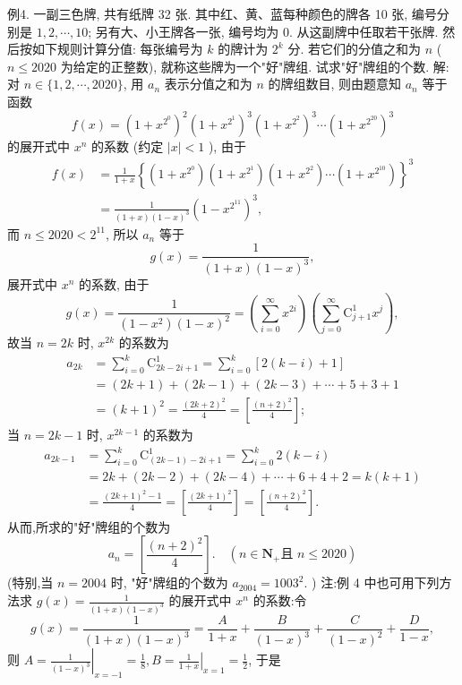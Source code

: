 例4. 一副三色牌, 共有纸牌 32 张.
其中红、黄、蓝每种颜色的牌各 10 张, 编号分别是 $1,2, \cdots, 10$; 另有大、小王牌各一张, 编号均为 0. 从这副牌中任取若干张牌.
然后按如下规则计算分值: 每张编号为 $k$ 的牌计为 $2^k$ 分.
若它们的分值之和为 $n$ ( $n \leqslant 2020$ 为给定的正整数), 就称这些牌为一个"好"牌组.
试求"好"牌组的个数.
解:对 $n \in\{1,2, \cdots, 2020\}$, 用 $a_n$ 表示分值之和为 $n$ 的牌组数目, 则由题意知 $a_n$ 等于函数
$$
f(x)=\left(1+x^{2^0}\right)^2\left(1+x^{2^1}\right)^3\left(1+x^{2^2}\right)^3 \cdots\left(1+x^{2^{20}}\right)^3
$$
的展开式中 $x^n$ 的系数 (约定 $|x|<1$ ), 由于
$$
\begin{aligned}
f(x) & =\frac{1}{1+x}\left\{\left(1+x^{2^0}\right)\left(1+x^{2^1}\right)\left(1+x^{2^2}\right) \cdots\left(1+x^{2^{10}}\right)\right\}^3 \\
& =\frac{1}{(1+x)(1-x)^3}\left(1-x^{2^{11}}\right)^3,
\end{aligned}
$$
而 $n \leqslant 2020<2^{11}$, 所以 $a_n$ 等于
$$
g(x)=\frac{1}{(1+x)(1-x)^3},
$$
展开式中 $x^n$ 的系数, 由于
$$
g(x)=\frac{1}{\left(1-x^2\right)(1-x)^2}=\left(\sum_{i=0}^{\infty} x^{2 i}\right)\left(\sum_{j=0}^{\infty} \mathrm{C}_{j+1}^1 x^j\right),
$$
故当 $n=2 k$ 时, $x^{2 k}$ 的系数为
$$
\begin{aligned}
a_{2 k} & =\sum_{i=0}^k \mathrm{C}_{2 k-2 i+1}^1=\sum_{i=0}^k[2(k-i)+1] \\
& =(2 k+1)+(2 k-1)+(2 k-3)+\cdots+5+3+1 \\
& =(k+1)^2=\frac{(2 k+2)^2}{4}=\left[\frac{(n+2)^2}{4}\right] ;
\end{aligned}
$$
当 $n=2 k-1$ 时, $x^{2 k-1}$ 的系数为
$$
\begin{aligned}
a_{2 k-1} & =\sum_{i=0}^k \mathrm{C}_{(2 k-1)-2 i+1}^1=\sum_{i=0}^k 2(k-i) \\
& =2 k+(2 k-2)+(2 k-4)+\cdots+6+4+2=k(k+1) \\
& =\frac{(2 k+1)^2-1}{4}=\left[\frac{(2 k+1)^2}{4}\right]=\left[\frac{(n+2)^2}{4}\right] .
\end{aligned}
$$
从而,所求的"好"牌组的个数为
$$
a_n=\left[\frac{(n+2)^2}{4}\right] . \quad\left(n \in \mathbf{N}_{+} \text {且 } n \leqslant 2020\right)
$$
(特别,当 $n=2004$ 时, "好"牌组的个数为 $a_{2004}=1003^2$. )
注:例 4 中也可用下列方法求 $g(x)=\frac{1}{(1+x)(1-x)^3}$ 的展开式中 $x^n$ 的系数:令
$$
g(x)=\frac{1}{(1+x)(1-x)^3}=\frac{A}{1+x}+\frac{B}{(1-x)^3}+\frac{C}{(1-x)^2}+\frac{D}{1-x},
$$
则 $A=\left.\frac{1}{(1-x)^3}\right|_{x=-1}=\frac{1}{8}, B=\left.\frac{1}{1+x}\right|_{x=1}=\frac{1}{2}$, 于是
